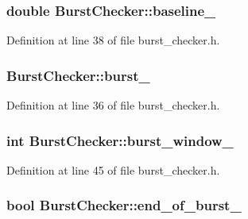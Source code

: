 \subsubsection[{baseline\-\_\-}]{\setlength{\rightskip}{0pt plus 5cm}double {\bf \-Burst\-Checker\-::baseline\-\_\-}\hspace{0.3cm}{\ttfamily  [private]}}\label{classBurstChecker_ac4f75b97e41a821be44400854a15706d}


\-Definition at line 38 of file burst\-\_\-checker.\-h.

\subsubsection[{burst\-\_\-}]{ {\bf \-Burst\-Checker\-::burst\-\_\-}\hspace{0.3cm}{\ttfamily  [private]}}\label{classBurstChecker_ab88dde232fd565bce5e01131ecec87cc}


\-Definition at line 36 of file burst\-\_\-checker.\-h.

\subsubsection[{burst\-\_\-window\-\_\-}]{\setlength{\rightskip}{0pt plus 5cm}int {\bf \-Burst\-Checker\-::burst\-\_\-window\-\_\-}\hspace{0.3cm}{\ttfamily  [private]}}\label{classBurstChecker_aa784791a8d29207f86b2fb6e128b6a91}


\-Definition at line 45 of file burst\-\_\-checker.\-h.

\subsubsection[{end\-\_\-of\-\_\-burst\-\_\-}]{\setlength{\rightskip}{0pt plus 5cm}bool {\bf \-Burst\-Checker\-::end\-\_\-of\-\_\-burst\-\_\-}\hspace{0.3cm}{\ttfamily  [private]}}\label{classBurstChecker_ab877d0fb4c70f73380cb2075bba31a0c}


